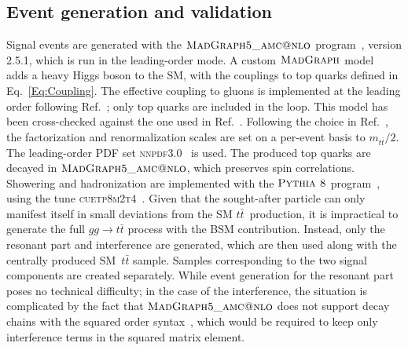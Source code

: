 \subsection{Event generation and validation}
\label{sec:sig_gen_val}
%
Signal events are generated with the $\textsc{MadGraph5\_amc@nlo}$ program~\cite{Alwall:2011uj}, version 2.5.1, which is run in the leading-order mode.
A custom $\textsc{MadGraph}$ model~\cite{MassiveHiggsUFO} adds a heavy Higgs boson to the SM, with the couplings to top quarks defined in Eq.~\ref{Eq:Coupling}.
The effective coupling to gluons is implemented at the leading order following Ref.~\cite{Spira:1995rr}; only top quarks are included in the loop. %
This model has been cross-checked against the one used in Ref.~\cite{Hespel:2016qaf}.
Following the choice in Ref.~\cite{Hespel:2016qaf}, the factorization and renormalization scales are set on a per-event basis to $m_{t\bar t} / 2$.
The leading-order PDF set \textsc{nnpdf3.0}~\cite{Ball:2014uwa} is used.
The produced top quarks are decayed in $\textsc{MadGraph5\_amc@nlo}$, which preserves spin correlations.
Showering and hadronization are implemented with the $\textsc{Pythia~8}$ program~\cite{Sjostrand:2007gs}, using the tune \textsc{cuetp8m2t4}~\cite{CMS-PAS-TOP-16-021}.
Given that the sought-after particle can only manifest itself in small deviations from the SM $t\bar t$~production, it is impractical to generate the full $gg \rightarrow t\bar t$ process with the BSM contribution.
Instead, only the resonant part and interference are generated, which are then used along with the centrally produced SM~$t\bar t$ sample.
Samples corresponding to the two signal components are created separately.
While event generation for the resonant part poses no technical difficulty; in the case of the interference, the situation is complicated by the fact that $\textsc{MadGraph5\_amc@nlo}$ does not support decay chains with the squared order syntax~\cite{MadGraphIntDecays}, which would be required to keep only interference terms in the squared matrix element.

